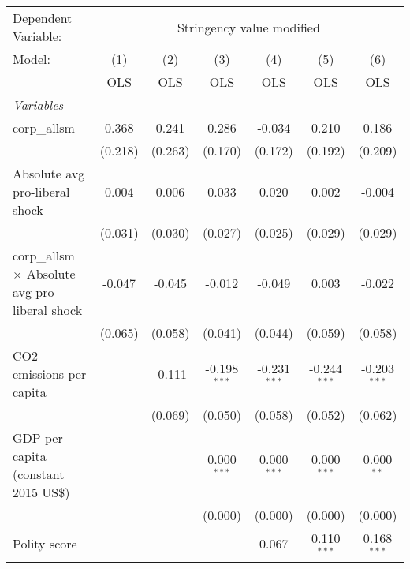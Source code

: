 
\begingroup
\centering
\begin{tabular}{lcccccc}
   \toprule
   Dependent Variable: & \multicolumn{6}{c}{Stringency value modified}\\
   Model:                                                & (1)     & (2)     & (3)            & (4)            & (5)            & (6)\\  
                                                         &  OLS    & OLS     & OLS            & OLS            & OLS            & OLS\\  
   \midrule
   \emph{Variables}\\
   corp\_allsm                                           & 0.368   & 0.241   & 0.286          & -0.034         & 0.210          & 0.186\\   
                                                         & (0.218) & (0.263) & (0.170)        & (0.172)        & (0.192)        & (0.209)\\   
   Absolute avg pro-liberal shock                        & 0.004   & 0.006   & 0.033          & 0.020          & 0.002          & -0.004\\   
                                                         & (0.031) & (0.030) & (0.027)        & (0.025)        & (0.029)        & (0.029)\\   
   corp\_allsm $\times$ Absolute avg pro-liberal shock   & -0.047  & -0.045  & -0.012         & -0.049         & 0.003          & -0.022\\   
                                                         & (0.065) & (0.058) & (0.041)        & (0.044)        & (0.059)        & (0.058)\\   
   CO2 emissions per capita                              &         & -0.111  & -0.198$^{***}$ & -0.231$^{***}$ & -0.244$^{***}$ & -0.203$^{***}$\\   
                                                         &         & (0.069) & (0.050)        & (0.058)        & (0.052)        & (0.062)\\   
   GDP per capita (constant 2015 US\$)                   &         &         & 0.000$^{***}$  & 0.000$^{***}$  & 0.000$^{***}$  & 0.000$^{**}$\\   
                                                         &         &         & (0.000)        & (0.000)        & (0.000)        & (0.000)\\   
   Polity score                                          &         &         &                & 0.067          & 0.110$^{***}$  & 0.168$^{***}$\\   

\end{tabular}
